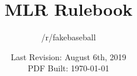 \documentclass{article}
\title{MLR Rulebook}
\author{/r/fakebaseball}
\date{Last Revision: August 6th, 2019\\PDF Built: \today}
\begin{document}
    \maketitle
    \pagebreak

    \tableofcontents
    \pagebreak

    


    
\end{document}
